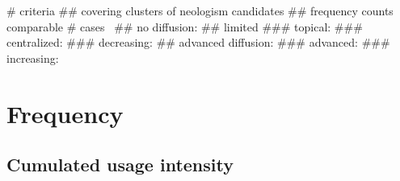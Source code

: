 \documentclass[a4paper]{scrartcl}
\begin{document}

      \begin{easylist}[itemize]
        # criteria
          ## covering clusters of neologism candidates
          ## frequency counts comparable
        # cases~\parencite{Kerremans2015}
          ## no diffusion: 
          ## limited
            ### topical: 
            ### centralized: 
            ### decreasing: 
          ## advanced diffusion:
            ### advanced: 
            ### increasing: 
      \end{easylist}

\section{Frequency}

  \subsection{Cumulated usage intensity}
\end{document}
